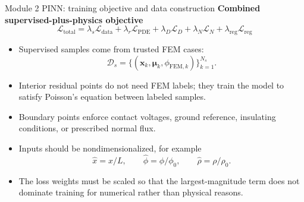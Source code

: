 \documentclass[aspectratio=169,10pt]{beamer}
\begin{document}
\begin{frame}{Module 2 PINN: training objective and data construction}
\footnotesize
\textbf{Combined supervised-plus-physics objective}
\vspace{-0.25em}
\begin{equation*}
\boxed{
\mathcal L_{\mathrm{total}}
=\lambda_s\mathcal L_{\mathrm{data}}
+\lambda_r\mathcal L_{\mathrm{PDE}}
+\lambda_D\mathcal L_D
+\lambda_N\mathcal L_N
+\lambda_{\mathrm{reg}}\mathcal L_{\mathrm{reg}}
}
\end{equation*}

\vspace{-0.15em}
\begin{itemize}
    \item Supervised samples come from trusted FEM cases:
    \[
        \mathcal D_s=\{(\mathbf x_k,\boldsymbol\mu_k,\phi_{\mathrm{FEM},k})\}_{k=1}^{N_s}.
    \]
    \item Interior residual points do not need FEM labels; they train the model to satisfy Poisson's equation between labeled samples.
    \item Boundary points enforce contact voltages, ground reference, insulating conditions, or prescribed normal flux.
    \item Inputs should be nondimensionalized, for example
    \[
        \hat x=x/L,
        \qquad
        \hat\phi=\phi/\phi_0,
        \qquad
        \hat\rho=\rho/\rho_0.
    \]
    \item The loss weights must be scaled so that the largest-magnitude term does not dominate training for numerical rather than physical reasons.
\end{itemize}
\end{frame}
\end{document}
